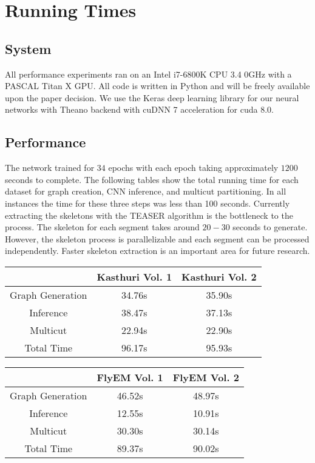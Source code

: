 \section{Running Times}

\subsection{System}

All performance experiments ran on an Intel i7-6800K CPU 3.4 0GHz with a PASCAL Titan X GPU. 
All code is written in Python and will be freely available upon the paper decision.
We use the Keras deep learning library for our neural networks with Theano backend with cuDNN 7 acceleration for cuda 8.0. 

\subsection{Performance}

The network trained for $34$ epochs with each epoch taking approximately $1200$ seconds to complete.
The following tables show the total running time for each dataset for graph creation, CNN inference, and multicut partitioning. 
In all instances the time for these three steps was less than 100 seconds.
Currently extracting the skeletons with the TEASER algorithm is the bottleneck to the process.
The skeleton for each segment takes around $20-30$ seconds to generate. 
However, the skeleton process is parallelizable and each segment can be processed independently.
Faster skeleton extraction is an important area for future research.

\begin{table}[t]
	\centering
	\small
	\begin{tabular}{c c c } \hline
		& Kasthuri Vol. 1 & Kasthuri Vol. 2 \\ \hline
		Graph Generation & 34.76s & 35.90s \\
		Inference & 38.47s & 37.13s \\
		Multicut & 22.94s & 22.90s \\ \hline
		Total Time & 96.17s & 95.93s \\ \hline
	\end{tabular}
	\begin{tabular}{c c c } \hline
		& FlyEM Vol. 1 & FlyEM Vol. 2 \\ \hline
		Graph Generation & 46.52s & 48.97s \\
		Inference & 12.55s & 10.91s \\
		Multicut & 30.30s & 30.14s \\ \hline
		Total Time & 89.37s & 90.02s \\ \hline
	\end{tabular}
\end{table}